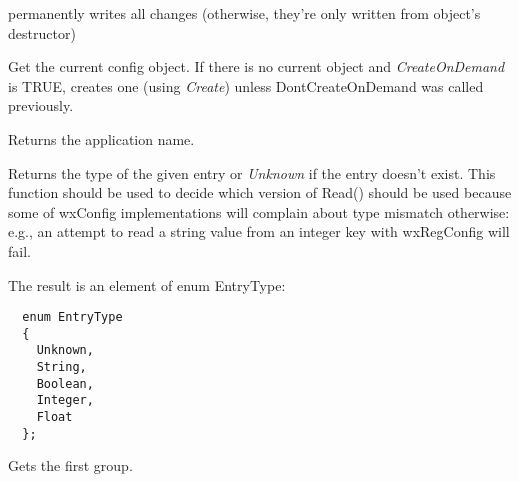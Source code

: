 \label{wxconfigbaseflush}


permanently writes all changes (otherwise, they're only written from object's
destructor)

\label{wxconfigbaseget}


Get the current config object. If there is no current object and
{\it CreateOnDemand} is TRUE, creates one
(using {\it Create}) unless DontCreateOnDemand was called previously.

\label{wxconfigbasegetappname}


Returns the application name.

\label{wxconfigbasegetentrytype}


Returns the type of the given entry or {\it Unknown} if the entry doesn't
exist. This function should be used to decide which version of Read() should
be used because some of wxConfig implementations will complain about type
mismatch otherwise: e.g., an attempt to read a string value from an integer
key with wxRegConfig will fail.

The result is an element of enum EntryType:

\begin{verbatim}
  enum EntryType
  {
    Unknown,
    String,
    Boolean,
    Integer,
    Float
  };
\end{verbatim}

\label{wxconfigbasegetfirstgroup}


Gets the first group.


\label{wxconfigbasegetfirstentry}


